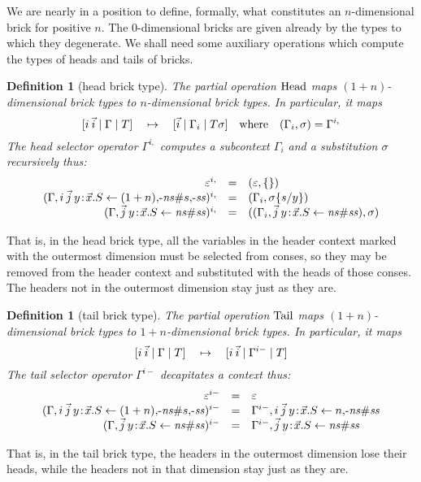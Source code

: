 \documentclass{article}
\newtheorem{defn}[thm]{Definition}
\begin{document}
We are nearly in a position to define, formally, what constitutes an $n$-dimensional brick for positive $n$. The $0$-dimensional bricks are given already by the types to which they degenerate. We shall need some auxiliary operations which compute the types of heads and tails of bricks.


\newcommand{\hsel}[2]{#2^{#1,}}
\newcommand{\tsel}[2]{#2^{#1-}}
\begin{defn}[head brick type]
  The partial operation $\mathrm{Head}$ maps $(1+n)$-dimensional brick types to $n$-dimensional brick types. In particular, it maps
  \[[i\:\vec i \st \Gamma \st T] \quad\mapsto\quad
    [\vec i \st \Gamma_i \st T\sigma]\quad \mbox{where}\quad (\Gamma_i,\sigma) = \hsel i\Gamma
  \]
  The head selector operator $\hsel i \Gamma$ computes a subcontext $\Gamma_i$ and a substitution $\sigma$ recursively thus:
  \[\begin{array}{rcl}
  \hsel i\emp & = & (\emp, \{\}) \\
  \hsel i{(\Gamma,i\:\vec j\g y\hb\vec x.S\from (1+n)\cons\ns\siz s\cons\ss)} & = &
  (\Gamma_i, \sigma\{s/y\}) \\
  \hsel i{(\Gamma,\vec j\g y\hb\vec x.S\from \ns\siz\ss)} & = &
  ((\Gamma_i,\vec j\g y\hb\vec x.S\from \ns\siz\ss), \sigma) \\  
  \end{array}\]
\end{defn}
That is, in the head brick type, all the variables in the header context marked with the outermost dimension must be selected from conses, so they may be removed from the header context and substituted with the heads of those conses. The headers not in the outermost dimension stay just as they are.

\begin{defn}[tail brick type]
  The partial operation $\mathrm{Tail}$ maps $(1+n)$-dimensional brick types to $1+n$-dimensional brick types. In particular, it maps
  \[[i\:\vec i \st \Gamma \st T] \quad\mapsto\quad
    [i\:\vec i \st \tsel i\Gamma \st T]
  \]
  The tail selector operator $\tsel i \Gamma$ decapitates a context thus:
  \[\begin{array}{rcl}
  \tsel i\emp & = & \emp \\
  \tsel i{(\Gamma,i\:\vec j\g y\hb\vec x.S\from (1+n)\cons\ns\siz s\cons\ss)} & = &
    \tsel i\Gamma, i\:\vec j\g y\hb\vec x.S\from n\cons\ns\siz\ss \\
  \tsel i{(\Gamma,\vec j\g y\hb\vec x.S\from \ns\siz\ss)} & = &
    \tsel i\Gamma,\vec j\g y\hb\vec x.S\from \ns\siz\ss \\  
  \end{array}\]
\end{defn}
That is, in the tail brick type, the headers in the outermost dimension lose their heads, while the headers not in that dimension stay just as they are.
\end{document}
